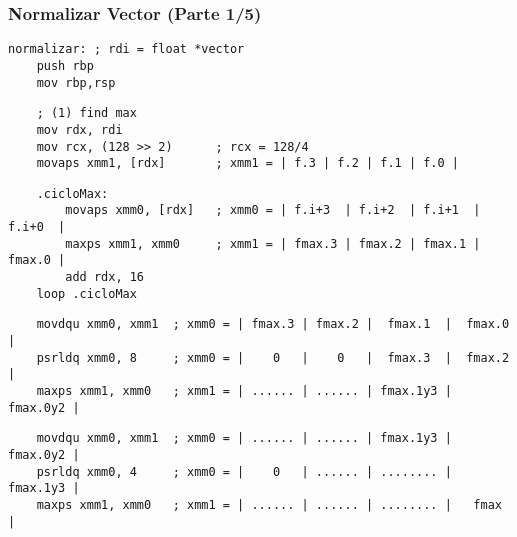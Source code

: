 \documentclass[aspectratio=169]{beamer}
\begin{document}
\begin{frame}[fragile,t]
    \frametitle{Normalizar Vector (Parte 1/5)}
    \footnotesize
    \begin{verbatim}
normalizar: ; rdi = float *vector
    push rbp
    mov rbp,rsp
    \end{verbatim}
    \pause
    \scriptsize
    \vspace{-0.8cm}
    \begin{verbatim}
    ; (1) find max
    mov rdx, rdi
    mov rcx, (128 >> 2)      ; rcx = 128/4
    movaps xmm1, [rdx]       ; xmm1 = | f.3 | f.2 | f.1 | f.0 |
    \end{verbatim}
    \vspace{-0.8cm} \pause
    \begin{verbatim}
    .cicloMax:
        movaps xmm0, [rdx]   ; xmm0 = | f.i+3  | f.i+2  | f.i+1  | f.i+0  |
        maxps xmm1, xmm0     ; xmm1 = | fmax.3 | fmax.2 | fmax.1 | fmax.0 |
        add rdx, 16
    loop .cicloMax
    \end{verbatim}
    \vspace{-0.8cm} \pause
    \begin{verbatim}
    movdqu xmm0, xmm1  ; xmm0 = | fmax.3 | fmax.2 |  fmax.1  |  fmax.0  |
    psrldq xmm0, 8     ; xmm0 = |    0   |    0   |  fmax.3  |  fmax.2  |
    maxps xmm1, xmm0   ; xmm1 = | ...... | ...... | fmax.1y3 | fmax.0y2 |
    \end{verbatim}
    \vspace{-0.8cm} \pause
    \begin{verbatim}
    movdqu xmm0, xmm1  ; xmm0 = | ...... | ...... | fmax.1y3 | fmax.0y2 |
    psrldq xmm0, 4     ; xmm0 = |    0   | ...... | ........ | fmax.1y3 |
    maxps xmm1, xmm0   ; xmm1 = | ...... | ...... | ........ |   fmax   |
    \end{verbatim}
\end{frame}
\end{document}
